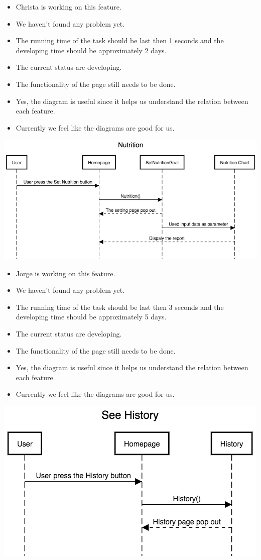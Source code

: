 \documentclass[a4paper]{article}
\begin{document}
\begin{itemize}
	\item Christa is working on this feature. 
	\item We haven't found any problem yet.
    \item The running time of the task should be last then 1 seconds and the developing time should be approximately 2 days.
    \item The current status are developing.
  \item The functionality of the page still needs to be done.
  \item Yes, the diagram is useful since it helps us understand the relation between each feature.
  \item Currently we feel like the diagrams are good for us.
\end{itemize}
\includegraphics[width=\textwidth, height=8 cm]{Nutrition.png}
\begin{itemize}
	\item Jorge is working on this feature. 
	\item We haven't found any problem yet.
    \item The running time of the task should be last then 3 seconds and the developing time should be approximately 5 days.
    \item The current status are developing.
  \item The functionality of the page still needs to be done.
  \item Yes, the diagram is useful since it helps us understand the relation between each feature.
  \item Currently we feel like the diagrams are good for us.
\end{itemize}
\includegraphics[width=\textwidth, height=8 cm]{See_History.png}
\end{document}
